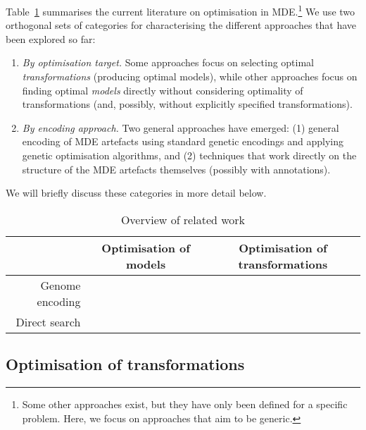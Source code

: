 	Table~\ref{table:related_work} summarises the current literature on optimisation in MDE.\footnote{Some other approaches exist, but they have only been defined
	for a specific problem. Here, we focus on approaches that aim to be generic.} We use two orthogonal sets of categories for characterising the different
	approaches that have been explored so far:
	\begin{enumerate}
		\item \emph{By optimisation target.} Some approaches focus on selecting optimal \emph{transformations} (producing optimal models), while other
		      approaches focus on finding optimal \emph{models} directly without considering optimality of transformations (and, possibly, without
					explicitly specified transformations).
		\item \emph{By encoding approach.} Two general approaches have emerged: (1) general encoding of MDE artefacts using standard genetic
		      encodings and applying genetic optimisation algorithms, and (2) techniques that work directly on the structure of the MDE artefacts themselves (possibly
					with annotations).
	\end{enumerate}
	We will briefly discuss these categories in more detail below.
	
	\begin{table}[tbp]
		\centering
			\begin{tabular}{r|cc}
				                & Optimisation of models                         & Optimisation of transformations \\
				\hline 
				Genome encoding & \cite{Efstathiou+14b,Williams13,Kessentini+13} & \cite{Fleck+15,Abdeen+14} \\
				Direct search   & \cite{Denil+14,Burton+12,BurtonPoulding13}     & \cite{Drago+10,Drago+11,Drago+15} \\
			\end{tabular}
		\caption{Overview of related work}
		\label{table:related_work}
	\end{table}
	

	\subsection{Optimisation of transformations}

